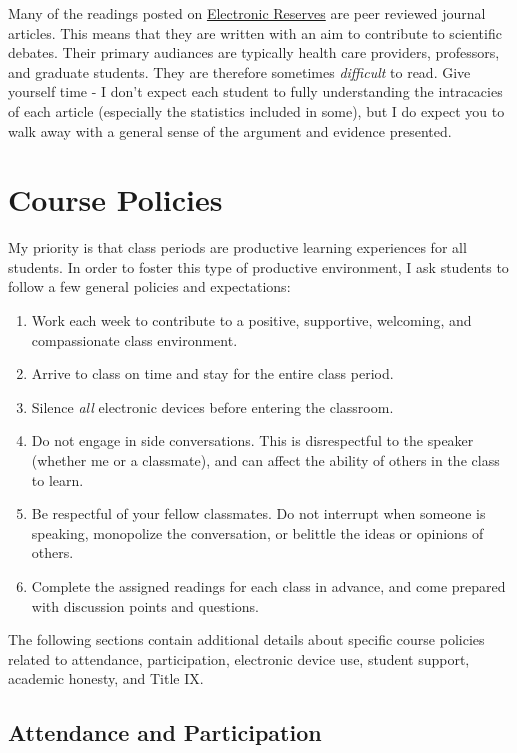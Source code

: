 \documentclass[]{book}
\providecommand{\tightlist}{%
  \setlength{\itemsep}{0pt}\setlength{\parskip}{0pt}}
\theoremstyle{definition}
\theoremstyle{definition}
\theoremstyle{definition}
\theoremstyle{remark}
\begin{document}
Many of the readings posted on
\href{http://eres.slu.edu/eres/coursepass.aspx?cid=4443}{Electronic
Reserves} are peer reviewed journal articles. This means that they are
written with an aim to contribute to scientific debates. Their primary
audiances are typically health care providers, professors, and graduate
students. They are therefore sometimes \emph{difficult} to read. Give
yourself time - I don't expect each student to fully understanding the
intracacies of each article (especially the statistics included in
some), but I do expect you to walk away with a general sense of the
argument and evidence presented.

\hypertarget{course-policies}{%
\chapter{Course Policies}\label{course-policies}}

My priority is that class periods are productive learning experiences
for all students. In order to foster this type of productive
environment, I ask students to follow a few general policies and
expectations:

\begin{enumerate}
\def\labelenumi{\arabic{enumi}.}
\tightlist
\item
  Work each week to contribute to a positive, supportive, welcoming, and
  compassionate class environment.
\item
  Arrive to class on time and stay for the entire class period.
\item
  Silence \emph{all} electronic devices before entering the classroom.
\item
  Do not engage in side conversations. This is disrespectful to the
  speaker (whether me or a classmate), and can affect the ability of
  others in the class to learn.
\item
  Be respectful of your fellow classmates. Do not interrupt when someone
  is speaking, monopolize the conversation, or belittle the ideas or
  opinions of others.
\item
  Complete the assigned readings for each class in advance, and come
  prepared with discussion points and questions.
\end{enumerate}

The following sections contain additional details about specific course
policies related to attendance, participation, electronic device use,
student support, academic honesty, and Title IX.

\hypertarget{attendance-and-participation}{%
\section{Attendance and
Participation}\label{attendance-and-participation}}
\end{document}
